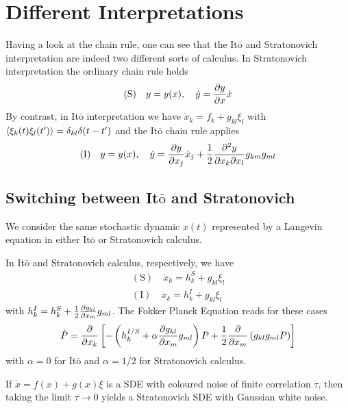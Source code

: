 \documentclass{notebook}
\begin{document}
\section{Different Interpretations}

Having a look at the chain rule, one can see that the It$\bar{\mathrm{o}}$ and Stratonovich interpretation are indeed two different sorts of calculus. In Stratonovich interpretation the ordinary chain rule holds
%
\begin{equation}
\mathrm{(S)} \quad y = y(x), \quad \dot{y} = \pdv{y}{x} \dot{x}
\end{equation}
%
By contrast, in It$\bar{\mathrm{o}}$ interpretation we have $\dot{x}_k = f_k + g_{kl} \xi_l$ with $\expval{\xi_k(t) \xi_l(t')} = \delta_{kl} \delta(t-t')$ and the It$\bar{\mathrm{o}}$ chain rule applies
%
\begin{equation}
\mathrm{(I)} \quad y = y(x), \quad \dot{y} = \pdv{y}{x_j} \dot{x}_j + \frac{1}{2} \pdv[2]{y}{x_k}{x_l} g_{km} g_{ml}
\end{equation}
%

\subsection*{Switching between It$\bar{\mathrm{o}}$ and Stratonovich}

We consider the same stochastic dynamic $x(t)$ represented by a Langevin equation in either It$\bar{\mathrm{o}}$ or Stratonovich calculus. 

In It$\bar{\mathrm{o}}$ and Stratonovich calculus, respectively, we have
%
\begin{gather*}
\mathrm{(S)} \quad \dot{x}_k = h^S_k + g_{kl} \xi_l \\
\mathrm{(I)} \quad \dot{x}_k = h^I_k + g_{kl} \xi_l
\end{gather*}
%
with $h^I_k = h^S_k + \frac{1}{2} \pdv{g_{kl}}{x_m} g_{ml}$. The Fokker Planck Equation reads for these cases
%
\begin{equation}
\dot{P} = \pdv{x_k} \left[ -\left( h^{I/S}_k + \alpha \pdv{g_{kl}}{x_m} g_{ml} \right) P + \frac{1}{2} \pdv{x_m} \left( g_{kl} g_{ml} P \right) \right]
\end{equation}
%
with $\alpha = 0$ for It$\bar{\mathrm{o}}$ and $\alpha = 1/2$ for Stratonovich calculus.

\begin{theorem}
	If $\dot{x} = f(x) + g(x) \xi$ is a SDE with coloured noise of finite correlation $\tau$, then taking the limit $\tau \to 0$ yields a Stratonovich SDE with Gaussian white noise.
\end{theorem}
\end{document}
